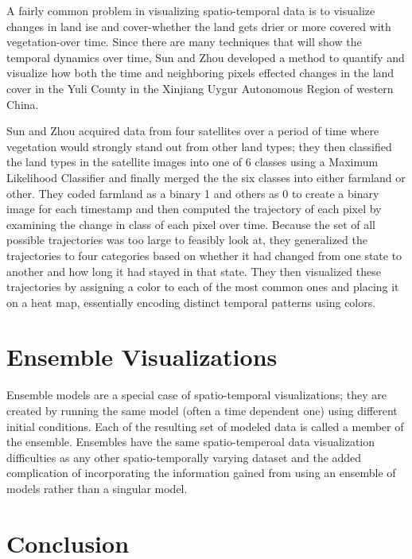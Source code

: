 \documentclass[letterpaper,onecolumn,titlepage]{Ythesis}
\begin{document}
A fairly common problem in visualizing spatio-temporal data is to visualize changes in land ise and cover-whether the land gets drier or more covered with vegetation-over time. Since there are many techniques that will show the temporal dynamics over time, Sun and Zhou \cite{SunZhou16} developed a method to quantify and visualize how both the time and neighboring pixels effected changes in the land cover in the Yuli County in the Xinjiang Uygur
Autonomous Region of western China. 

Sun and Zhou acquired data from four satellites over a period of time where vegetation would strongly stand out from other land types; they then classified the land types in the satellite images into one of 6 classes using a Maximum Likelihood Classifier and finally merged the the six classes into either farmland or other. They coded farmland as a binary 1 and others as 0 to create a binary image for each timestamp and then computed the trajectory of each pixel by examining the change in class of each pixel over time. Because the set of all possible trajectories was too large to feasibly look at, they generalized the trajectories to four categories based on whether it had changed from one state to another and how long it had stayed in that state. They then visualized these trajectories by assigning a color to each of the most common ones and placing it on a heat map, essentially encoding distinct temporal patterns using colors. 



\section{Ensemble Visualizations}
Ensemble models are a special case of spatio-temporal visualizations; they are created by running the same model (often a time dependent one) using different initial conditions. Each of the resulting set of modeled data is called a member of the ensemble. Ensembles have the same spatio-temperoal data visualization difficulties as any other spatio-temporally varying dataset and the added complication of incorporating the information gained from using an ensemble of models rather than a singular model. 





\section{Conclusion}
\label{sec:conclusion}


\pagebreak


\end{document}
